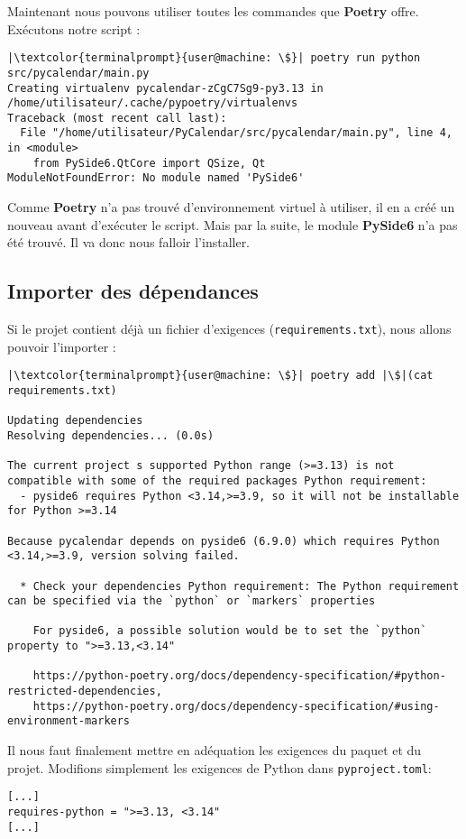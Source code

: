 Maintenant nous pouvons utiliser toutes les commandes que \textbf{Poetry} offre. Exécutons notre script :
\begin{lstlisting}[style=terminal]
|\textcolor{terminalprompt}{user@machine: \$}| poetry run python src/pycalendar/main.py
Creating virtualenv pycalendar-zCgC7Sg9-py3.13 in /home/utilisateur/.cache/pypoetry/virtualenvs
Traceback (most recent call last):
  File "/home/utilisateur/PyCalendar/src/pycalendar/main.py", line 4, in <module>
    from PySide6.QtCore import QSize, Qt
ModuleNotFoundError: No module named 'PySide6'
\end{lstlisting}

Comme \textbf{Poetry} n’a pas trouvé d’environnement virtuel à utiliser, il en a créé un nouveau avant d’exécuter le script. Mais par la suite, le module \textbf{PySide6} n'a pas été trouvé. Il va donc nous falloir l'installer.

\subsection*{Importer des dépendances}
Si le projet contient déjà un fichier d'exigences (\texttt{requirements.txt}), nous allons pouvoir l'importer :
\begin{lstlisting}[style=terminal]
|\textcolor{terminalprompt}{user@machine: \$}| poetry add |\$|(cat requirements.txt)

Updating dependencies
Resolving dependencies... (0.0s)

The current project s supported Python range (>=3.13) is not compatible with some of the required packages Python requirement:
  - pyside6 requires Python <3.14,>=3.9, so it will not be installable for Python >=3.14

Because pycalendar depends on pyside6 (6.9.0) which requires Python <3.14,>=3.9, version solving failed.

  * Check your dependencies Python requirement: The Python requirement can be specified via the `python` or `markers` properties

    For pyside6, a possible solution would be to set the `python` property to ">=3.13,<3.14"

    https://python-poetry.org/docs/dependency-specification/#python-restricted-dependencies,
    https://python-poetry.org/docs/dependency-specification/#using-environment-markers
\end{lstlisting}

Il nous faut finalement mettre en adéquation les exigences du paquet et du projet. Modifions simplement les exigences de Python dans \texttt{pyproject.toml}:
\begin{verbatim}
[...]
requires-python = ">=3.13, <3.14"
[...]
\end{verbatim}

